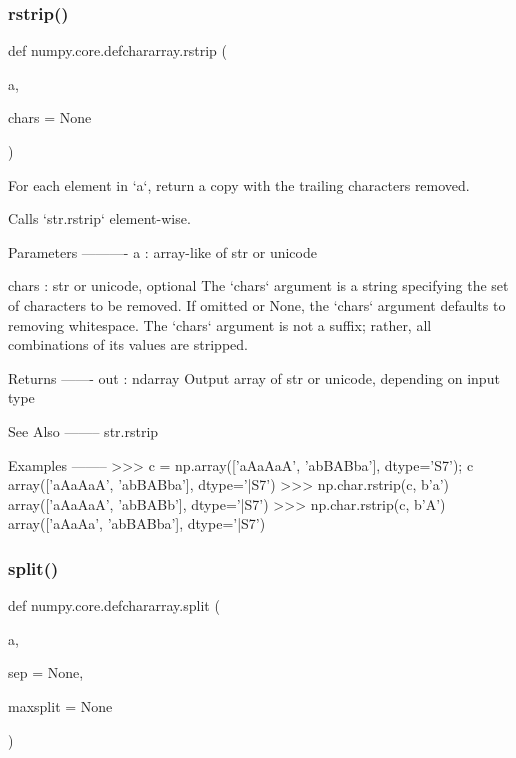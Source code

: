 \subsubsection{\texorpdfstring{rstrip()}{rstrip()}}
{\footnotesize\ttfamily def numpy.\+core.\+defchararray.\+rstrip (\begin{DoxyParamCaption}\item[{}]{a,  }\item[{}]{chars = {\ttfamily None} }\end{DoxyParamCaption})}

\begin{DoxyVerb}For each element in `a`, return a copy with the trailing
characters removed.

Calls `str.rstrip` element-wise.

Parameters
----------
a : array-like of str or unicode

chars : str or unicode, optional
   The `chars` argument is a string specifying the set of
   characters to be removed. If omitted or None, the `chars`
   argument defaults to removing whitespace. The `chars` argument
   is not a suffix; rather, all combinations of its values are
   stripped.

Returns
-------
out : ndarray
    Output array of str or unicode, depending on input type

See Also
--------
str.rstrip

Examples
--------
>>> c = np.array(['aAaAaA', 'abBABba'], dtype='S7'); c
array(['aAaAaA', 'abBABba'],
    dtype='|S7')
>>> np.char.rstrip(c, b'a')
array(['aAaAaA', 'abBABb'],
    dtype='|S7')
>>> np.char.rstrip(c, b'A')
array(['aAaAa', 'abBABba'],
    dtype='|S7')\end{DoxyVerb}
 \mbox{\label{namespacenumpy_1_1core_1_1defchararray_a11dc6218a2920f5f41979d00bd53efd5}} 
\subsubsection{\texorpdfstring{split()}{split()}}
{\footnotesize\ttfamily def numpy.\+core.\+defchararray.\+split (\begin{DoxyParamCaption}\item[{}]{a,  }\item[{}]{sep = {\ttfamily None},  }\item[{}]{maxsplit = {\ttfamily None} }\end{DoxyParamCaption})}

